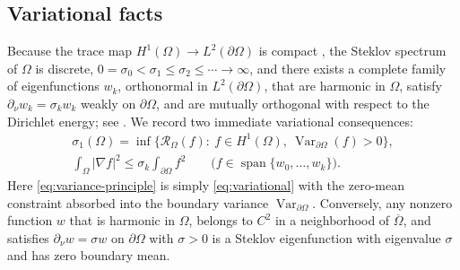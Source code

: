 \documentclass[11pt,reqno]{amsart}
\numberwithin{equation}{section}
\theoremstyle{remark}
\newcommand{\Ray}{\mathcal R}
\DeclareMathOperator{\Var}{Var}
\begin{document}
\subsection{Variational facts}
Because the trace map $H^1(\Omega)\to L^2(\partial\Omega)$ is compact
\cite[Chapter~3]{McLean}, the Steklov spectrum of $\Omega$ is discrete,
$0=\sigma_0<\sigma_1\le\sigma_2\le\cdots\to\infty$, and there exists a complete
family of eigenfunctions $w_k$, orthonormal in $L^2(\partial\Omega)$, that are
harmonic in $\Omega$, satisfy $\partial_\nu w_k=\sigma_kw_k$ weakly on
$\partial\Omega$, and are mutually orthogonal with respect to the Dirichlet
energy; see \cite{GP,CGGS}. We record two immediate variational consequences:
\begin{gather}
 \sigma_1(\Omega)=\inf\bigl\{\Ray_\Omega(f):\ f\in H^1(\Omega),\
   \Var_{\partial\Omega}(f)>0\bigr\},\label{eq:variance-principle}\\
 \int_\Omega|\nabla f|^2\le\sigma_k\int_{\partial\Omega}f^2
 \qquad\bigl(f\in\operatorname{span}\{w_0,\dots,w_k\}\bigr).
 \label{eq:span-bound}
\end{gather}
Here \eqref{eq:variance-principle} is simply \eqref{eq:variational} with the
zero-mean constraint absorbed into the boundary variance $\Var_{\partial\Omega}$.
Conversely, any nonzero function $w$ that is harmonic in $\Omega$, belongs to
$C^2$ in a neighborhood of $\overline\Omega$, and satisfies
$\partial_\nu w=\sigma w$ on $\partial\Omega$ with $\sigma>0$ is a Steklov
eigenfunction with eigenvalue $\sigma$ and has zero boundary mean.
\end{document}
